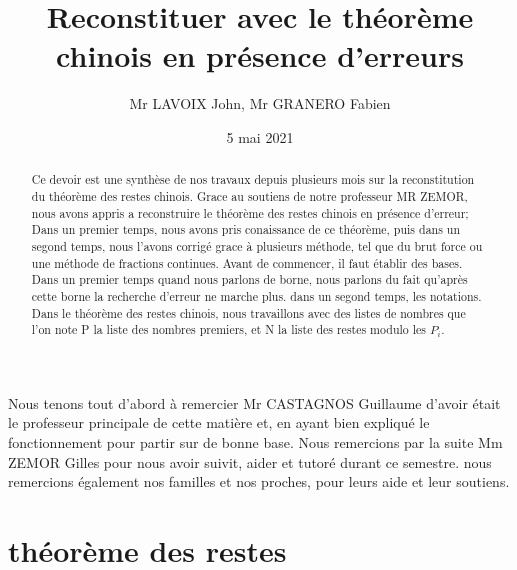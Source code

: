 \documentclass[a4paper, 11pt]{article}
\begin{document}
\title{Reconstituer avec le théorème chinois en présence d’erreurs}
\author{Mr LAVOIX John, Mr GRANERO Fabien }
\date{5 mai 2021}



\begin{abstract}

    Ce devoir est une synthèse de nos travaux depuis plusieurs mois sur la reconstitution du théorème des restes chinois. 
Grace au soutiens de notre professeur MR ZEMOR, nous avons appris a reconstruire le théorème des restes chinois en présence d'erreur;
Dans un premier temps, nous avons pris conaissance de ce théorème, puis dans un segond temps, nous l'avons corrigé grace à plusieurs méthode, 
tel que du brut force ou une méthode de fractions continues.
\newline 
Avant de commencer, il faut établir des bases. Dans un premier temps quand nous parlons de borne, nous parlons du fait qu'après cette borne la recherche d'erreur ne marche plus.
dans un segond temps, les notations. Dans le théorème des restes chinois, nous travaillons avec des listes de nombres que l'on note P la liste des nombres premiers, et N la liste des restes modulo les $P_i$.


\end{abstract}

\newpage

\tableofcontents

\newpage
\begin{flushleft}
    Nous tenons tout d'abord à remercier Mr CASTAGNOS Guillaume d'avoir était le professeur principale de cette matière et,
en ayant bien expliqué le fonctionnement pour partir sur de bonne base. Nous remercions par la suite Mm ZEMOR Gilles pour nous 
avoir suivit, aider et tutoré durant ce semestre.
\newline 
nous remercions également nos familles et nos proches, pour leurs aide et leur soutiens.
\end{flushleft}

\newpage

\section{théorème des restes}
\end{document}
